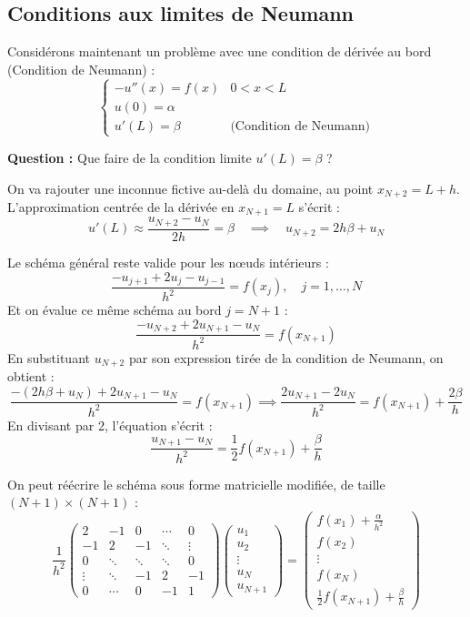 \subsection{Conditions aux limites de Neumann}

Considérons maintenant un problème avec une condition de dérivée au bord (Condition de Neumann) :
$$
\begin{cases}
-u''(x) = f(x) & 0 < x < L \\
u(0) = \alpha & \\
u'(L) = \beta & \text{(Condition de Neumann)}
\end{cases}
$$

\textbf{Question :} Que faire de la condition limite $u'(L) = \beta$ ?

\begin{algorithme}
On va rajouter une inconnue fictive au-delà du domaine, au point $x_{N+2} = L + h$.
L'approximation centrée de la dérivée en $x_{N+1} = L$ s'écrit :
$$u'(L) \approx \frac{u_{N+2} - u_N}{2h} = \beta \quad \implies \quad u_{N+2} = 2h\beta + u_N$$

Le schéma général reste valide pour les nœuds intérieurs :
$$\frac{-u_{j+1} + 2u_j - u_{j-1}}{h^2} = f(x_j), \quad j=1, \dots, N$$
Et on évalue ce même schéma au bord $j = N+1$ :
$$\frac{-u_{N+2} + 2u_{N+1} - u_N}{h^2} = f(x_{N+1})$$
En substituant $u_{N+2}$ par son expression tirée de la condition de Neumann, on obtient :
$$\frac{-(2h\beta + u_N) + 2u_{N+1} - u_N}{h^2} = f(x_{N+1}) \implies \frac{2u_{N+1} - 2u_N}{h^2} = f(x_{N+1}) + \frac{2\beta}{h}$$
En divisant par 2, l'équation s'écrit :
$$\frac{u_{N+1} - u_N}{h^2} = \frac{1}{2}f(x_{N+1}) + \frac{\beta}{h}$$
\end{algorithme}

On peut réécrire le schéma sous forme matricielle modifiée, de taille $(N+1) \times (N+1)$ :
$$
\frac{1}{h^2}
\begin{pmatrix}
2 & -1 & 0 & \cdots & 0 \\
-1 & 2 & -1 & \ddots & \vdots \\
0 & \ddots & \ddots & \ddots & 0 \\
\vdots & \ddots & -1 & 2 & -1 \\
0 & \cdots & 0 & -1 & 1
\end{pmatrix}
\begin{pmatrix}
u_1 \\
u_2 \\
\vdots \\
u_N \\
u_{N+1}
\end{pmatrix}
=
\begin{pmatrix}
f(x_1) + \frac{\alpha}{h^2} \\
f(x_2) \\
\vdots \\
f(x_N) \\
\frac{1}{2}f(x_{N+1}) + \frac{\beta}{h}
\end{pmatrix}
$$

